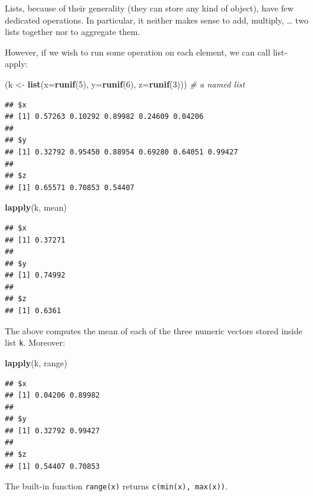 \documentclass[10pt,b5paper,krantz1]{krantz}
\newenvironment{Shaded}{\begin{snugshade}}{\end{snugshade}}
\newcommand{\CommentTok}[1]{\textcolor[rgb]{0.37,0.37,0.37}{\textit{#1}}}
\newcommand{\DataTypeTok}[1]{\textcolor[rgb]{0.27,0.27,0.27}{#1}}
\newcommand{\DecValTok}[1]{\textcolor[rgb]{0.06,0.06,0.06}{#1}}
\newcommand{\KeywordTok}[1]{\textcolor[rgb]{0.27,0.27,0.27}{\textbf{#1}}}
\newcommand{\NormalTok}[1]{#1}
\newcommand{\StringTok}[1]{\textcolor[rgb]{0.5,0.5,0.5}{#1}}
\begin{document}
Lists, because of their generality (they can store any kind of object),
have few dedicated operations.
In particular, it neither makes sense to add, multiply, \ldots{} two lists together
nor to aggregate them.

However, if we wish to run some operation on each element, we can call
list-apply:

\begin{Shaded}
\begin{Highlighting}[]
\NormalTok{(k <-}\StringTok{ }\KeywordTok{list}\NormalTok{(}\DataTypeTok{x=}\KeywordTok{runif}\NormalTok{(}\DecValTok{5}\NormalTok{), }\DataTypeTok{y=}\KeywordTok{runif}\NormalTok{(}\DecValTok{6}\NormalTok{), }\DataTypeTok{z=}\KeywordTok{runif}\NormalTok{(}\DecValTok{3}\NormalTok{))) }\CommentTok{# a named list}
\end{Highlighting}
\end{Shaded}

\begin{verbatim}
## $x
## [1] 0.57263 0.10292 0.89982 0.24609 0.04206
## 
## $y
## [1] 0.32792 0.95450 0.88954 0.69280 0.64051 0.99427
## 
## $z
## [1] 0.65571 0.70853 0.54407
\end{verbatim}

\begin{Shaded}
\begin{Highlighting}[]
\KeywordTok{lapply}\NormalTok{(k, mean)}
\end{Highlighting}
\end{Shaded}

\begin{verbatim}
## $x
## [1] 0.37271
## 
## $y
## [1] 0.74992
## 
## $z
## [1] 0.6361
\end{verbatim}

The above computes the mean of each of the three numeric vectors
stored inside list \texttt{k}.
Moreover:

\begin{Shaded}
\begin{Highlighting}[]
\KeywordTok{lapply}\NormalTok{(k, range)}
\end{Highlighting}
\end{Shaded}

\begin{verbatim}
## $x
## [1] 0.04206 0.89982
## 
## $y
## [1] 0.32792 0.99427
## 
## $z
## [1] 0.54407 0.70853
\end{verbatim}

The built-in function \texttt{range(x)} returns \texttt{c(min(x),\ max(x))}.
\end{document}
